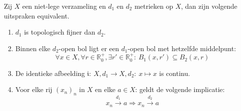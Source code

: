 \documentclass[main.tex]{subfiles}
\begin{document}
\begin{st}
  Zij $X$ een niet-lege verzameling en $d_{1}$ en $d_{2}$ metrieken op $X$, dan zijn volgende uitspraken equivalent.
  \begin{enumerate}
  \item $d_{1}$ is topologisch fijner dan $d_{2}$.
  \item Binnen elke $d_{2}$-open bol ligt er een $d_{1}$-open bol met hetzelfde middelpunt:
    \[ \forall x\in X, \forall r \in \mathbb{R}_{0}^{+}, \exists r' \in \mathbb{R}_{0}^{+}:\ B_{1}(x,r') \subseteq B_{2}(x,r) \]
  \item De identieke afbeelding $\mathfrak{i}:\ X,d_{1} \rightarrow X,d_{2}:\ x \mapsto x$ is continu.
  \item Voor elke rij $(x_{n})_{n}$ in $X$ en elke $a\in X$: geldt de volgende implicatie:
    \[ x_{n} \overset{d_{1}}{\rightarrow} a \Rightarrow x_{n} \overset{d_{2}}{\rightarrow} a \]
  \end{enumerate}


\end{st}
\end{document}
